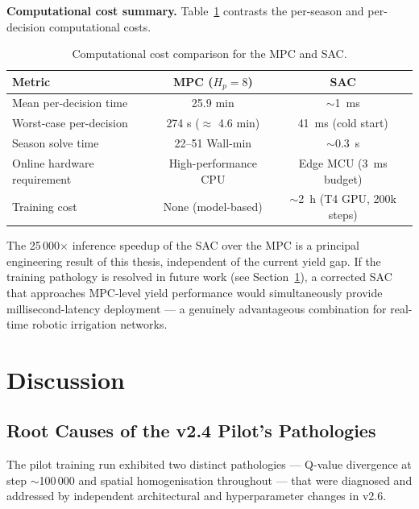 \textbf{Computational cost summary.}
Table~\ref{tab:latency} contrasts the per-season and per-decision computational costs.

\begin{table}[ht]
\centering
\caption{Computational cost comparison for the MPC and SAC.}
\label{tab:latency}
\begin{tabular}{lcc}
\hline
\textbf{Metric} & \textbf{MPC ($H_p = 8$)} & \textbf{SAC} \\
\hline
Mean per-decision time     & 25.9 min          & $\sim$1~ms \\
Worst-case per-decision    & 274 s ($\approx$ 4.6 min) & 41~ms (cold start) \\
Season solve time          & 22--51 Wall-min   & $\sim$0.3~s \\
Online hardware requirement & High-performance CPU & Edge MCU (3~ms budget) \\
Training cost              & None (model-based) & $\sim$2~h (T4 GPU, 200k steps) \\
\hline
\end{tabular}
\end{table}

The 25\,000$\times$ inference speedup of the SAC over the MPC is a principal engineering
result of this thesis, independent of the current yield gap.
If the training pathology is resolved in future work (see Section~\ref{sec:discussion}),
a corrected SAC that approaches MPC-level yield performance would simultaneously provide
millisecond-latency deployment — a genuinely advantageous combination for real-time
robotic irrigation networks.

\section{Discussion}
\label{sec:discussion}

\subsection{Root Causes of the v2.4 Pilot's Pathologies}

The pilot training run exhibited two distinct pathologies — Q-value divergence at
step $\sim$100\,000 and spatial homogenisation throughout — that were diagnosed and
addressed by independent architectural and hyperparameter changes in v2.6.

